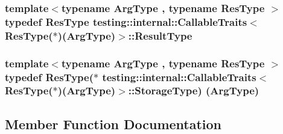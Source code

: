 \subsubsection[{\texorpdfstring{Result\+Type}{ResultType}}]{\setlength{\rightskip}{0pt plus 5cm}template$<$typename Arg\+Type , typename Res\+Type $>$ typedef Res\+Type {\bf testing\+::internal\+::\+Callable\+Traits}$<$ Res\+Type($\ast$)(Arg\+Type)$>$\+::{\bf Result\+Type}}\hypertarget{structtesting_1_1internal_1_1_callable_traits_3_01_res_type_07_5_08_07_arg_type_08_4_a1959235d286e9c9bb57c1c1139a0cbd8}{}\label{structtesting_1_1internal_1_1_callable_traits_3_01_res_type_07_5_08_07_arg_type_08_4_a1959235d286e9c9bb57c1c1139a0cbd8}
\subsubsection[{\texorpdfstring{Storage\+Type}{StorageType}}]{\setlength{\rightskip}{0pt plus 5cm}template$<$typename Arg\+Type , typename Res\+Type $>$ typedef Res\+Type($\ast$ {\bf testing\+::internal\+::\+Callable\+Traits}$<$ Res\+Type($\ast$)(Arg\+Type)$>$\+::Storage\+Type) (Arg\+Type)}\hypertarget{structtesting_1_1internal_1_1_callable_traits_3_01_res_type_07_5_08_07_arg_type_08_4_a0ee48af3b40e5c5bcb48a78cdacf6d9c}{}\label{structtesting_1_1internal_1_1_callable_traits_3_01_res_type_07_5_08_07_arg_type_08_4_a0ee48af3b40e5c5bcb48a78cdacf6d9c}


\subsection{Member Function Documentation}
